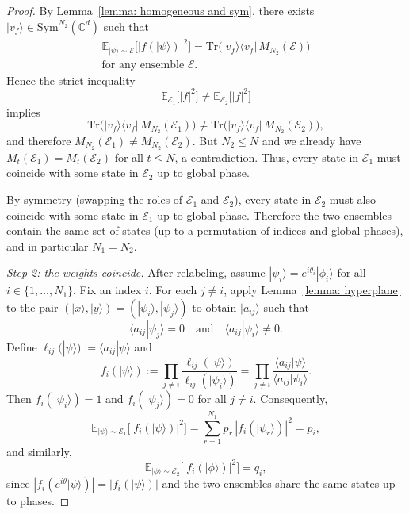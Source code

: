\documentclass[10pt,a4paper]{amsart}
\newcommand{\Abs}[1]{\left\lvert #1\right\rvert}
\providecommand{\ket}[1]{|#1 \rangle}
\providecommand{\braket}[2]{\langle #1|#2 \rangle}
\providecommand{\ketbra}[2]{|#1\rangle \langle #2|}
\newcommand{\dsE}{\mathbb{E}}
\theoremstyle{plain}
\theoremstyle{definition}
\theoremstyle{remark}
\begin{document}
\begin{proof}
By Lemma~\ref{lemma: homogeneous and sym}, there exists $\ket{v_f}\in\mathrm{Sym}^{N_2}(\mathbb C^d)$
such that
\[
\begin{gathered}
\dsE_{\ket{\psi}\sim\mathcal E}\!\big[\Abs{f(\ket{\psi})}^2\big]
=
\mathrm{Tr}\!\Big(\ketbra{v_f}{v_f}\,M_{N_2}(\mathcal E)\Big)
\\
\text{for any ensemble }\mathcal E.
\end{gathered}
\]
Hence the strict inequality
\[
\dsE_{\mathcal E_1}\!\big[\Abs{f}^2\big] \neq \dsE_{\mathcal E_2}\!\big[\Abs{f}^2\big]
\]
implies
\[
\mathrm{Tr}\!\Big(\ketbra{v_f}{v_f}\,M_{N_2}(\mathcal E_1)\Big)
\neq
\mathrm{Tr}\!\Big(\ketbra{v_f}{v_f}\,M_{N_2}(\mathcal E_2)\Big),
\]
and therefore $M_{N_2}(\mathcal E_1)\neq M_{N_2}(\mathcal E_2)$.
But $N_2\le N$ and we already have $M_t(\mathcal E_1)=M_t(\mathcal E_2)$ for all $t\le N$, a contradiction.
Thus, every state in $\mathcal E_1$ must coincide with some state in $\mathcal E_2$ up to global phase.

By symmetry (swapping the roles of $\mathcal E_1$ and $\mathcal E_2$), every state in $\mathcal E_2$ must also coincide
with some state in $\mathcal E_1$ up to global phase. Therefore the two ensembles contain the same set of states (up to
a permutation of indices and global phases), and in particular $N_1=N_2$.

\medskip
\noindent\textit{Step 2: the weights coincide.}
After relabeling, assume $\ket{\psi_i}=e^{i\theta_i}\ket{\phi_i}$ for all $i\in\{1,\dots,N_1\}$.
Fix an index $i$. For each $j\neq i$, apply Lemma~\ref{lemma: hyperplane}
to the pair $(\ket{x},\ket{y})=(\ket{\psi_i},\ket{\psi_j})$ to obtain $\ket{a_{ij}}$ such that
\[
\braket{a_{ij}}{\psi_j}=0
\quad\text{and}\quad
\braket{a_{ij}}{\psi_i}\neq 0.
\]
Define $\ell_{ij}(\ket{\psi}) := \braket{a_{ij}}{\psi}$ and
\begin{equation}
f_i(\ket{\psi})
:=\prod_{j\neq i}\frac{\ell_{ij}(\ket{\psi})}{\ell_{ij}(\ket{\psi_i})}
=\prod_{j\neq i}\frac{\braket{a_{ij}}{\psi}}{\braket{a_{ij}}{\psi_i}}.
\label{eq:app-weight-interpolation-polynomial}
\end{equation}
Then $f_i(\ket{\psi_i})=1$ and $f_i(\ket{\psi_j})=0$ for all $j\neq i$.
Consequently,
\[
\dsE_{\ket{\psi}\sim\mathcal E_1}\!\big[\Abs{f_i(\ket{\psi})}^2\big]
= \sum_{r=1}^{N_1} p_r\,\Abs{f_i(\ket{\psi_r})}^2
= p_i,
\]
and similarly,
\[
\dsE_{\ket{\phi}\sim\mathcal E_2}\!\big[\Abs{f_i(\ket{\phi})}^2\big]
= q_i,
\]
since $\Abs{f_i(e^{i\theta}\ket{\psi})}=\Abs{f_i(\ket{\psi})}$ and the two ensembles share the same states up to phases.


\end{proof}
\end{document}
